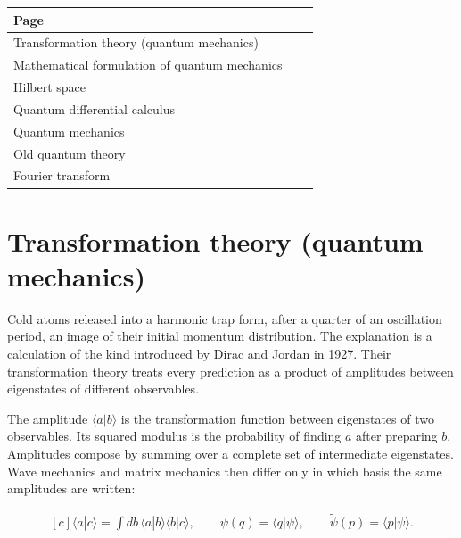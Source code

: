 \documentclass[11pt,oneside]{book}
\newenvironment{centeredalign}{\[\begin{gathered}[c]}{\end{gathered}\]}
\begin{document}
\begin{longtable}{p{0.92\linewidth}}
\toprule
Page \\
\midrule
\endhead
{}\label{page:transformation-theory-quantum-mechanics}Transformation theory (quantum mechanics) \\
\label{page:mathematical-formulation-of-quantum-mechanics}Mathematical formulation of quantum mechanics \\
\label{page:hilbert-space}Hilbert space \\
\label{page:quantum-differential-calculus}Quantum differential calculus \\
\label{page:quantum-mechanics}Quantum mechanics \\
\label{page:old-quantum-theory}Old quantum theory \\
\label{page:fourier-transform}Fourier transform \\
\bottomrule
\end{longtable}

\clearpage

\section{Transformation theory (quantum mechanics)}

\label{topic:transformation-theory-quantum-mechanics}

Cold atoms released into a harmonic trap form, after a quarter of an oscillation period, an image of their initial momentum distribution. The explanation is a calculation of the kind introduced by Dirac and Jordan in 1927. Their transformation theory treats every prediction as a product of amplitudes between eigenstates of different observables.

The amplitude \(\langle a|b\rangle\) is the transformation function between eigenstates of two observables. Its squared modulus is the probability of finding \(a\) after preparing \(b\). Amplitudes compose by summing over a complete set of intermediate eigenstates. Wave mechanics and matrix mechanics then differ only in which basis the same amplitudes are written:

\begin{centeredalign}
\langle a|c\rangle=\int db\,\langle a|b\rangle\langle b|c\rangle,\qquad
\psi(q)=\langle q|\psi\rangle,\qquad \widetilde\psi(p)=\langle p|\psi\rangle.
\end{centeredalign}
\end{document}
